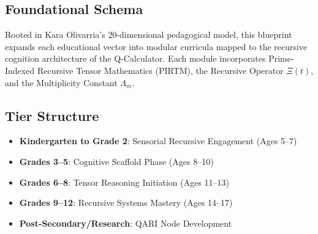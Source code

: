\documentclass{article}
\theoremstyle{plain}
\theoremstyle{claimstyle}
\begin{document}
\subsection*{Foundational Schema}
Rooted in Kara Olivarria's 20-dimensional pedagogical model, this blueprint expands each educational vector into modular curricula mapped to the recursive cognition architecture of the Q-Calculator. Each module incorporates Prime-Indexed Recursive Tensor Mathematics (PIRTM), the Recursive Operator $\Xi(t)$, and the Multiplicity Constant $\Lambda_m$.

\subsection*{Tier Structure}
\begin{itemize}
\item \textbf{Kindergarten to Grade 2}: Sensorial Recursive Engagement (Ages 5--7)
\item \textbf{Grades 3--5}: Cognitive Scaffold Phase (Ages 8--10)
\item \textbf{Grades 6--8}: Tensor Reasoning Initiation (Ages 11--13)
\item \textbf{Grades 9--12}: Recursive Systems Mastery (Ages 14--17)
\item \textbf{Post-Secondary/Research}: QARI Node Development
\end{itemize}
\end{document}
